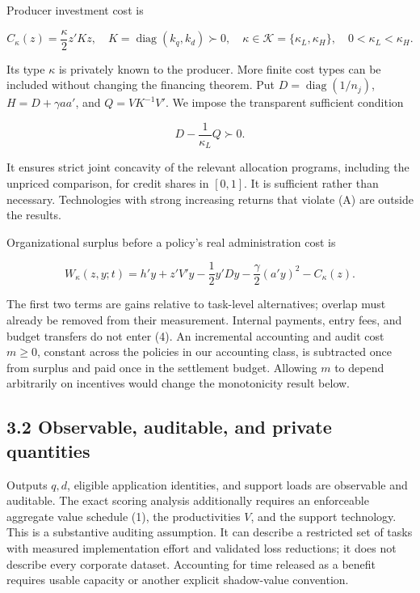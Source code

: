 \documentclass[
  11pt,
]{article}
\begin{document}
Producer investment cost is

\[C_\kappa(z)=\frac{\kappa}{2}z'Kz,\quad
K=\operatorname{diag}(k_q,k_d)\succ0,
\quad \kappa\in\mathcal K=\{\kappa_L,\kappa_H\},\quad0<\kappa_L<\kappa_H. \tag{3}\]

Its type \(\kappa\) is privately known to the producer. More finite cost
types can be included without changing the financing theorem. Put
\(D=\operatorname{diag}(1/n_j)\), \(H=D+\gamma aa'\), and
\(Q=VK^{-1}V'\). We impose the transparent sufficient condition

\[D-\frac{1}{\kappa_L}Q\succ0. \tag{A}\]

It ensures strict joint concavity of the relevant allocation programs,
including the unpriced comparison, for credit shares in \([0,1]\). It is
sufficient rather than necessary. Technologies with strong increasing
returns that violate (A) are outside the results.

Organizational surplus before a policy's real administration cost is

\[W_\kappa(z,y;t)=h'y+z'V'y-\frac12y'Dy
-\frac\gamma2(a'y)^2-C_\kappa(z). \tag{4}\]

The first two terms are gains relative to task-level alternatives;
overlap must already be removed from their measurement. Internal
payments, entry fees, and budget transfers do not enter (4). An
incremental accounting and audit cost \(m\geq0\), constant across the
policies in our accounting class, is subtracted once from surplus and
paid once in the settlement budget. Allowing \(m\) to depend arbitrarily
on incentives would change the monotonicity result below.

\subsection{3.2 Observable, auditable, and private
quantities}\label{observable-auditable-and-private-quantities}

Outputs \(q,d\), eligible application identities, and support loads are
observable and auditable. The exact scoring analysis additionally
requires an enforceable aggregate value schedule (1), the productivities
\(V\), and the support technology. This is a substantive auditing
assumption. It can describe a restricted set of tasks with measured
implementation effort and validated loss reductions; it does not
describe every corporate dataset. Accounting for time released as a
benefit requires usable capacity or another explicit shadow-value
convention.
\end{document}
